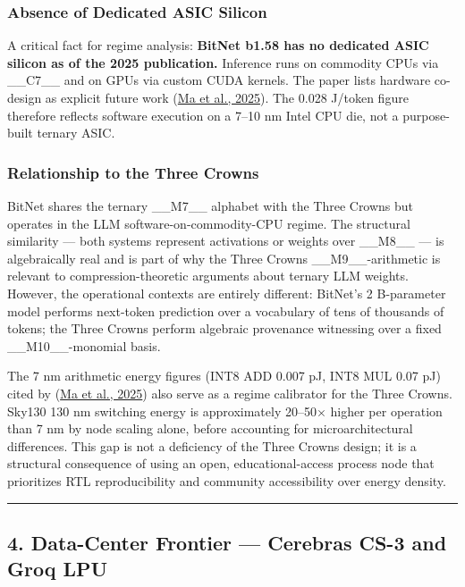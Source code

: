 \subsubsection{Absence of Dedicated ASIC Silicon}

A critical fact for regime analysis: \textbf{BitNet b1.58 has no dedicated ASIC silicon as of the 2025 publication.} Inference runs on commodity CPUs via \_\_C7\_\_ and on GPUs via custom CUDA kernels. The paper lists hardware co-design as explicit future work (\href{https://arxiv.org/abs/2504.12285}{Ma et al., 2025}). The 0.028 J/token figure therefore reflects software execution on a 7--10 nm Intel CPU die, not a purpose-built ternary ASIC.

\subsubsection{Relationship to the Three Crowns}

BitNet shares the ternary \_\_M7\_\_ alphabet with the Three Crowns but operates in the LLM software-on-commodity-CPU regime. The structural similarity --- both systems represent activations or weights over \_\_M8\_\_ --- is algebraically real and is part of why the Three Crowns \_\_M9\_\_-arithmetic is relevant to compression-theoretic arguments about ternary LLM weights. However, the operational contexts are entirely different: BitNet's 2 B-parameter model performs next-token prediction over a vocabulary of tens of thousands of tokens; the Three Crowns perform algebraic provenance witnessing over a fixed \_\_M10\_\_-monomial basis.

The 7 nm arithmetic energy figures (INT8 ADD 0.007 pJ, INT8 MUL 0.07 pJ) cited by (\href{https://arxiv.org/abs/2504.12285}{Ma et al., 2025}) also serve as a regime calibrator for the Three Crowns. Sky130 130 nm switching energy is approximately 20--50$\times$ higher per operation than 7 nm by node scaling alone, before accounting for microarchitectural differences. This gap is not a deficiency of the Three Crowns design; it is a structural consequence of using an open, educational-access process node that prioritizes RTL reproducibility and community accessibility over energy density.

\noindent\rule{\textwidth}{0.4pt}

\subsection{4. Data-Center Frontier --- Cerebras CS-3 and Groq LPU}

